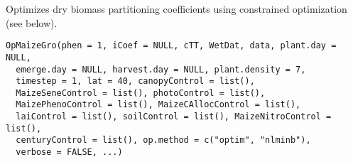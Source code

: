 \documentclass[letterpaper]{book}
\begin{document}
%
\begin{Description}\relax
Optimizes dry biomass partitioning coefficients using
constrained optimization (see below).
\end{Description}
%
\begin{Usage}
\begin{verbatim}
OpMaizeGro(phen = 1, iCoef = NULL, cTT, WetDat, data, plant.day = NULL,
  emerge.day = NULL, harvest.day = NULL, plant.density = 7,
  timestep = 1, lat = 40, canopyControl = list(),
  MaizeSeneControl = list(), photoControl = list(),
  MaizePhenoControl = list(), MaizeCAllocControl = list(),
  laiControl = list(), soilControl = list(), MaizeNitroControl = list(),
  centuryControl = list(), op.method = c("optim", "nlminb"),
  verbose = FALSE, ...)
\end{verbatim}
\end{Usage}
%
\end{document}
